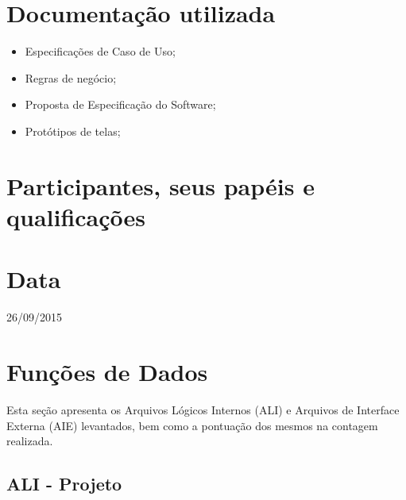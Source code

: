 \section{Documentação utilizada}

\begin{itemize}
 \item Especificações de Caso de Uso;
 \item Regras de negócio;
 \item Proposta de Especificação do Software;
 \item Protótipos de telas;
\end{itemize}

\section{Participantes, seus papéis e qualificações}

\section{Data}
26/09/2015

\vfill
\pagebreak
\section{Funções de Dados}

Esta seção apresenta os Arquivos Lógicos Internos (ALI) e Arquivos de Interface Externa (AIE) levantados, bem como a 
pontuação dos mesmos na contagem realizada.

  \subsection{ALI - Projeto}
  
